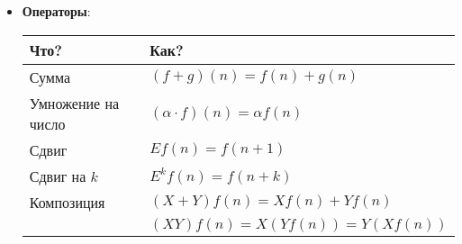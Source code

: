 \documentclass[12pt]{article}
\begin{document}
\begin{itemize}
        $\underset{\text{линейная комб. рекуррентных членов}}{\undergroup{k_1 a_n + k_2 a_{n - 1} + k_3 a_{n - 2} + \dots}} =
        \underset{\text{функция от }n}{\undergroup{f(n)}}$

        Линейное рекуррентное соотношение - $\begin{cases}f = 0 \Longrightarrow \text{гомогенное (однородное)} \\ f \neq 0 \Longrightarrow \text{негомогенное (неоднородное)}\end{cases}$

        \Exs Последовательность Фибоначчи:

        $F(n) = \begin{cases}0, \quad n = 0 \\ 1, \quad n = 1 \\ F(n - 1) + F(n - 2)\end{cases}$

        $F(n) - F(n - 1) - F(n - 2) = 0$ - однородное

        \item \textbf{Операторы}:

        \begin{tabular}{ll}
            \hline

            \hfil Что? & \hfil Как? \\

            \hline

            Сумма & $(f + g)(n) = f(n) + g(n)$ \\

            \hline

            Умножение на число & $(\alpha \cdot f)(n) = \alpha f(n)$ \\

            \hline

            Сдвиг & $E f(n) = f(n + 1)$ \\

            \hline

            Сдвиг на $k$ & $E^k f(n) = f(n + k)$ \\

            \hline

            Композиция & $(X + Y) f(n) = Xf(n) + Yf(n)$ \\

             & $(XY) f(n) = X(Yf(n)) = Y(Xf(n))$ \\

        \end{tabular}


\end{itemize}
\end{document}
